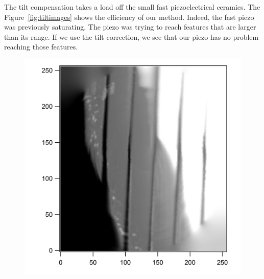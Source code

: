 The tilt compensation takes a load off the small fast piezoelectrical ceramics. The Figure~\ref{fig:tiltimages}  shows the efficiency of our method. Indeed, the fast piezo was previously saturating. The piezo was trying to reach features that are larger than its range. If we use the tilt correction, we see that our piezo has no problem reaching those features.

\begin{figure}[ht]
\begin{minipage}[b]{0.45\linewidth}
\centering
\includegraphics[width=\textwidth]{images/TiltSession0226_27.png}


\end{minipage}
\end{figure}
